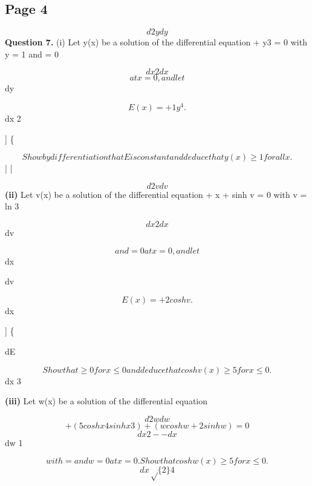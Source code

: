\documentclass[12pt]{article}
\begin{document}
\subsection*{Page 4}
\begin{flushleft}
\[d2y dy\]
\bigskip\textbf{Question 7.} (i) Let y(x) be a solution of the differential equation + y3 = 0 with y = 1 and = 0\par
\[dx2 dx\]
\[at x = 0, and let\]
dy\par
\[E(x) = + 1 y^4 .\]
dx 2\par
] \{\par
\[Show by differentiation that E is constant and deduce that y(x) \geq 1 for all x.\]
| |\par
\[d2v dv\]
\textbf{(ii)} Let v(x) be a solution of the differential equation + x + sinh v = 0 with v = ln 3\par
\[dx2 dx\]
dv\par
\[and = 0 at x = 0, and let\]
dx\par
dv\par
\[E(x) = + 2 cosh v .\]
dx\par
] \{\par
dE\par
\[Show that \geq 0 for x \leq 0 and deduce that cosh v(x) \geq 5 for x \leq 0.\]
dx 3\par
\textbf{(iii)} Let w(x) be a solution of the differential equation\par
\[d2w dw\]
\[+ (5 cosh x 4 sinh x 3) + (w cosh w + 2 sinh w) = 0\]
\[dx2 - - dx\]
dw 1\par
\[with = and w = 0 at x = 0. Show that cosh w(x) \geq 5 for x \leq 0.\]
\[dx \sqrt\{2\} 4\]
\end{flushleft}
\end{document}
